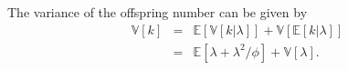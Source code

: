 \documentclass[AMA,STIX1COL]{WileyNJD-v2}
\begin{document}
The variance of the offspring number can be given by 
\begin{eqnarray}
\mathbb{V}[k] &=& \mathbb{E}[ \mathbb{V}[k|\lambda] ] + \mathbb{V}[ \mathbb{E}[k|\lambda] ] \nonumber\\
&=& \mathbb{E}[ \lambda + \lambda^2 / \phi ] + \mathbb{V}[ \lambda ].
\label{V_k}
\end{eqnarray}



\begin{comment}
Many authors submitting \( \sin \cos \tan \inf_{x} \) to NJD journals use \LaTeXe\ to
prepare their papers. This paper describes the
\textsf{WileyNJD-v2.cls} class file which can be used to convert
articles produced with other \LaTeXe\ class files into the correct
form for publication in \emph{Wiley NJD Journals}.

The \textsf{WileyNJD-v2.cls} class file preserves much of the standard
\LaTeXe\ interface so that any document which was produced using
the standard \LaTeXe\ \textsf{article} style can easily be
converted to work with the \textsf{WileyNJD-v2} style. However, the
width of text and typesize will vary from that of
\textsf{article.cls}; therefore, \emph{line breaks will change}
and it is likely that displayed mathematics and tabular material
will need re-setting.

In the following sections we describe how to lay out your code to
use \textsf{WileyNJD-v2.cls} to reproduce the typographical look of
\emph{Wiley NJD Journals}.

\subsection{Procedure to install fonts}
 
\begin{enumerate}
\item All font files are available under the Stix-fonts folder 
\item Font installer is available under the same folder Windows-Stix-fontinstaller.exe
\item Execute (double click the EXE file) the EXE file that will install all fonts/map files to your local drive.
\end{enumerate}

\subsection{The Three Golden Rules} 


\end{comment}
\end{document}
